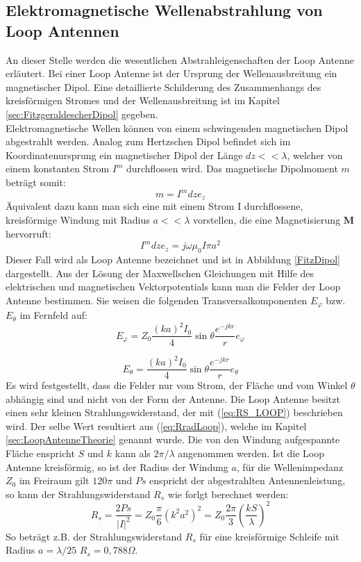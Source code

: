\subsection{Elektromagnetische Wellenabstrahlung von Loop Antennen}
An dieser Stelle werden die wesentlichen Abstrahleigenschaften der Loop Antenne erläutert.
Bei einer Loop Antenne ist der Ursprung der Wellenausbreitung ein magnetischer Dipol. Eine detaillierte Schilderung des Zusammenhangs des kreisförmigen Stromes und der Wellenausbreitung ist im Kapitel \ref{sec:FitzgeraldescherDipol} gegeben. \\
Elektromagnetische Wellen können von einem schwingenden magnetischen Dipol
abgestrahlt werden. Analog zum Hertzschen Dipol befindet sich im Koordinatenursprung
ein magnetischer Dipol der Länge $dz<<\lambda$, welcher von einem konstanten
Strom $I^{m}$ durchflossen wird. Das magnetische Dipolmoment $m$ beträgt somit:
\begin{equation}
m=I^{m}dze_z
\end{equation}
Äquivalent dazu kann man sich eine mit einem Strom I durchflossene, kreisförmige Windung mit Radius $a<<\lambda$ vorstellen, die eine Magnetisierung $\textbf{M}$ hervorruft:
\begin{equation}
I^{m}dze_{z}=j\omega\mu_{0}I\pi a^{2}
\end{equation}
Dieser Fall wird als Loop Antenne bezeichnet und ist in Abbildung \ref{FitzDipol} dargestellt. Aus der Lösung der Maxwellschen Gleichungen mit Hilfe des elektrischen und
magnetischen Vektorpotentials kann man die Felder der Loop Antenne bestimmen.
Sie weisen die folgenden Transversalkomponenten $E_{\varphi}$ bzw. $E_{\theta}$ im Fernfeld auf:
\begin{equation}
E_{\varphi}=Z_{0}\dfrac{(ka)^2I_{0}}{4}\sin \theta \dfrac{e^{-jkr}}{r} e_{\varphi}
\end{equation}

\begin{equation}
E_{\theta}=\dfrac{(ka)^2I_{0}}{4}\sin \theta \dfrac{e^{-jkr}}{r} e_{\theta}
\end{equation}
Es wird festgestellt, dass die Felder nur vom Strom, der Fläche und vom Winkel $\theta$ abhängig sind
und nicht von der Form der Antenne. 
Die Loop Antenne besitzt einen sehr kleinen Strahlungswiderstand, der mit (\ref{eq:RS_LOOP}) beschrieben wird. Der selbe Wert resultiert aus  (\ref{eq:RradLoop}), welche im Kapitel \ref{sec:LoopAntenneTheorie} genannt wurde. Die von den Windung aufgespannte Fläche enspricht $S$ und $k$ kann als $2\pi/\lambda$ angenommen werden. Ist die Loop Antenne kreisförmig, so ist der Radius der Windung $a$, für die Wellenimpedanz $Z_0$ im Freiraum gilt $120\pi$ und $Ps$ enspricht der abgestrahlten Antennenleistung, so kann der Strahlungswiderstand $R_s$ wie forlgt berechnet werden:
\begin{equation}\label{eq:RS_LOOP}
R_{s}=\dfrac{2Ps}{|I|^{2}}=Z_{0}\dfrac{\pi}{6}(k^{2}a^{2})^{2}=Z_{0}\dfrac{2\pi}{3}\left(\dfrac{kS}{\lambda}\right)^{2} 
\end{equation}
So beträgt z.B. der Strahlungswiderstand $R_{s}$ für eine kreisförmige Schleife mit Radius $a = \lambda/25$  $R_{s} = 0,788\Omega$.


